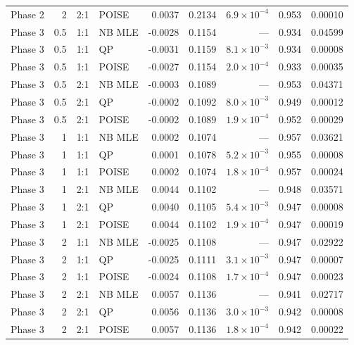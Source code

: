 \documentclass{article}
\begin{document}
\begin{table}[htbp]
\begin{tabular}{lrllrrrrr}
Phase 2 & 2 & 2:1 & POISE & 0.0037 & 0.2134 & $6.9 \times 10^{-4}$ & 0.953 & 0.00010 \\
Phase 3 & 0.5 & 1:1 & NB MLE & -0.0028 & 0.1154 & --- & 0.934 & 0.04599 \\
Phase 3 & 0.5 & 1:1 & QP & -0.0031 & 0.1159 & $8.1 \times 10^{-3}$ & 0.934 & 0.00008 \\
Phase 3 & 0.5 & 1:1 & POISE & -0.0027 & 0.1154 & $2.0 \times 10^{-4}$ & 0.933 & 0.00035 \\
Phase 3 & 0.5 & 2:1 & NB MLE & -0.0003 & 0.1089 & --- & 0.953 & 0.04371 \\
Phase 3 & 0.5 & 2:1 & QP & -0.0002 & 0.1092 & $8.0 \times 10^{-3}$ & 0.949 & 0.00012 \\
Phase 3 & 0.5 & 2:1 & POISE & -0.0002 & 0.1089 & $1.9 \times 10^{-4}$ & 0.952 & 0.00029 \\
Phase 3 & 1 & 1:1 & NB MLE & 0.0002 & 0.1074 & --- & 0.957 & 0.03621 \\
Phase 3 & 1 & 1:1 & QP & 0.0001 & 0.1078 & $5.2 \times 10^{-3}$ & 0.955 & 0.00008 \\
Phase 3 & 1 & 1:1 & POISE & 0.0002 & 0.1074 & $1.8 \times 10^{-4}$ & 0.957 & 0.00024 \\
Phase 3 & 1 & 2:1 & NB MLE & 0.0044 & 0.1102 & --- & 0.948 & 0.03571 \\
Phase 3 & 1 & 2:1 & QP & 0.0040 & 0.1105 & $5.4 \times 10^{-3}$ & 0.947 & 0.00008 \\
Phase 3 & 1 & 2:1 & POISE & 0.0044 & 0.1102 & $1.9 \times 10^{-4}$ & 0.947 & 0.00019 \\
Phase 3 & 2 & 1:1 & NB MLE & -0.0025 & 0.1108 & --- & 0.947 & 0.02922 \\
Phase 3 & 2 & 1:1 & QP & -0.0025 & 0.1111 & $3.1 \times 10^{-3}$ & 0.947 & 0.00007 \\
Phase 3 & 2 & 1:1 & POISE & -0.0024 & 0.1108 & $1.7 \times 10^{-4}$ & 0.947 & 0.00023 \\
Phase 3 & 2 & 2:1 & NB MLE & 0.0057 & 0.1136 & --- & 0.941 & 0.02717 \\
Phase 3 & 2 & 2:1 & QP & 0.0056 & 0.1136 & $3.0 \times 10^{-3}$ & 0.942 & 0.00008 \\
Phase 3 & 2 & 2:1 & POISE & 0.0057 & 0.1136 & $1.8 \times 10^{-4}$ & 0.942 & 0.00022 \\
\bottomrule
\end{tabular}
\end{table}
\end{document}
